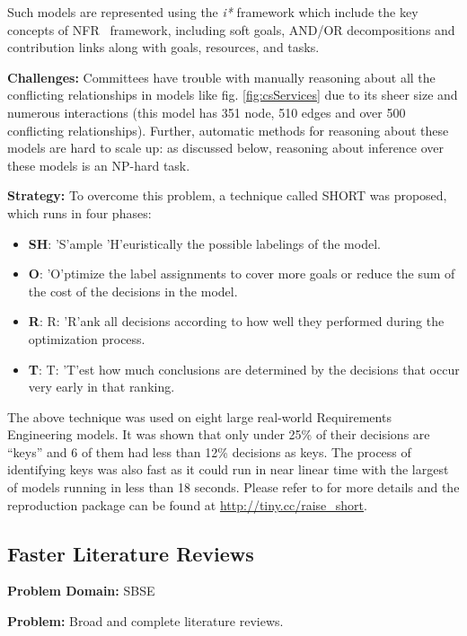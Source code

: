 \documentclass[sigconf]{acmart}
\begin{document}
Such models are represented using the \textit{i*} framework \cite{yu97a} which include the key concepts of NFR~\cite{mylopoulos92.nfr} framework, including soft goals, AND/OR decompositions and contribution links along with goals, resources, and tasks. 

\noindent\textbf{Challenges: } Committees have trouble with manually reasoning about all the conflicting relationships in models like fig. \ref{fig:csServices} due to its sheer size and numerous interactions (this model has 351 node, 510 edges and over 500 conflicting relationships). Further, automatic methods for reasoning about these models are hard to scale up: as discussed below, reasoning about inference over these models is an NP-hard task. 

\noindent\textbf{Strategy:} To overcome this problem, a technique called SHORT was proposed, which runs in four phases:
\begin{itemize}[leftmargin=*]
    \item{\textbf{SH}: 'S'ample 'H'euristically the possible labelings of the model.}
    \item{\textbf{O}: 'O'ptimize the label assignments to cover more goals or reduce the sum of the cost of the decisions in the model.}
    \item{\textbf{R}: R: 'R'ank all decisions according to how well they performed during the optimization process.}
    \item{\textbf{T}: T: 'T'est how much conclusions are determined by the decisions that occur very early in that ranking.}
\end{itemize}

The above technique was used on eight large real-world Requirements Engineering models. It was shown that only under 25\% of their decisions are ``keys'' and 6 of them had less than 12\% decisions as keys. The process of identifying keys was also fast as it could run in near linear time with the largest of models running in less than 18 seconds. Please refer to \cite{mathew2017shorter} for more details and the reproduction package can be found at \url{http://tiny.cc/raise_short}.

\subsection{Faster Literature Reviews}
\noindent\textbf{Problem Domain: } SBSE

\noindent\textbf{Problem: }
 Broad and complete literature reviews.
 
\end{document}
